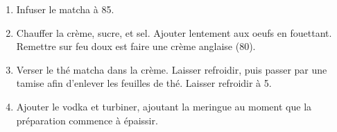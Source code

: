 

\begin{ingredients}
\end{ingredients}


\begin{recipe}
  \begin{enumerate}

  \item Infuser le matcha à 85\degreeC.

  \item Chauffer la crème, sucre, et sel.  Ajouter lentement aux oeufs
    en fouettant.  Remettre sur feu doux est faire une crème anglaise
    (80\degreeC).

  \item Verser le thé matcha dans la crème.  Laisser refroidir, puis
    passer par une tamise afin d'enlever les feuilles de thé.  Laisser
    refroidir à 5\degreeC.

  \item Ajouter le vodka et turbiner, ajoutant la meringue au moment
    que la préparation commence à épaissir.

  \end{enumerate}
\end{recipe}

